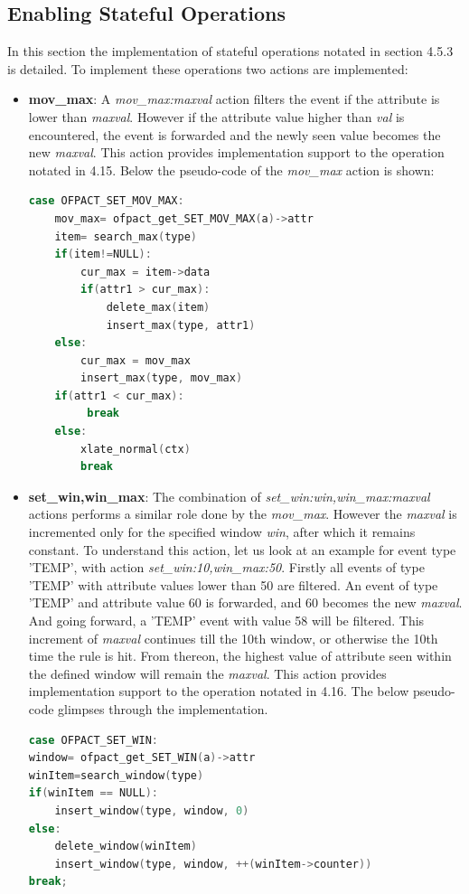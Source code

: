 \subsection{Enabling Stateful Operations}
In this section the implementation of stateful operations notated in section 4.5.3 is detailed. To implement these operations two actions are implemented:
\begin{itemize}
	\item \textbf{mov_max}: A \textit{mov_max:maxval} action filters the event if the attribute is lower than \textit{maxval}. However if the attribute value higher than \textit{val} is encountered, the event is forwarded and the newly seen value becomes the new \textit{maxval}. This action provides implementation support to the operation notated in 4.15. Below the pseudo-code of the \textit{mov_max} action is shown:\newline
	\begin{lstlisting}[language=c]
	case OFPACT_SET_MOV_MAX:	
	mov_max= ofpact_get_SET_MOV_MAX(a)->attr
	item= search_max(type)
	if(item!=NULL):                         
		cur_max = item->data
		if(attr1 > cur_max):
			delete_max(item)
			insert_max(type, attr1)                
	else:
		cur_max = mov_max
		insert_max(type, mov_max)
	if(attr1 < cur_max):
		 break
	else: 	
		xlate_normal(ctx) 	
		break 	
	\end{lstlisting}
	
	\item \textbf{set_win,win_max}: The combination of \textit{set_win:win,win_max:maxval} actions performs a similar role done by the \textit{mov_max}. However the \textit{maxval} is incremented only for the specified window \textit{win}, after which it remains constant. To understand this action, let us look at an example for event type 'TEMP', with action \textit{set_win:10,win_max:50}. Firstly all events of type 'TEMP' with attribute values lower than 50 are filtered. An event of type 'TEMP' and attribute value 60 is forwarded, and 60 becomes the new \textit{maxval}. And going forward, a 'TEMP' event with value 58 will be filtered. This increment of \textit{maxval} continues till the 10th window, or otherwise the 10th time the rule is hit. From thereon, the highest value of attribute seen within the defined window will remain the \textit{maxval}. This action provides implementation support to the operation notated in 4.16. The below pseudo-code glimpses through the implementation.
	
\begin{lstlisting}[language=c]
case OFPACT_SET_WIN:
window= ofpact_get_SET_WIN(a)->attr
winItem=search_window(type)
if(winItem == NULL):
	insert_window(type, window, 0)                       
else:
	delete_window(winItem)
	insert_window(type, window, ++(winItem->counter))       
break;


\end{lstlisting}
\end{itemize}
